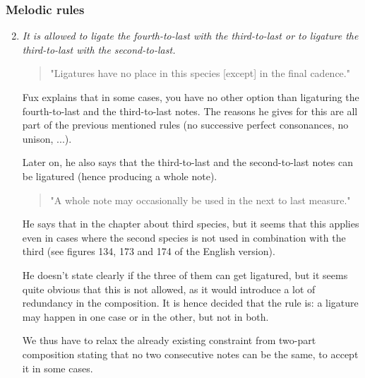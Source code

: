 \subsubsection{Melodic rules}
\begin{enumerate}[wide, label=\bfseries 2.M\arabic*]
\setcounter{enumi}{1} %
    \item \greendots \textit{It is allowed to ligate the fourth-to-last with the third-to-last or to ligature the third-to-last with the second-to-last.} \label{rule:2nd-species-ligatures}    
    \begin{quotation}
        "Ligatures have no place in this species [except] in the final cadence."
        \textcite[p.87]{GaPEng}
    \end{quotation}
    Fux explains that in some cases, you have no other option than ligaturing the fourth-to-last and the third-to-last notes. The reasons he gives for this are all part of the previous mentioned rules (no successive perfect consonances, no unison, ...).

    Later on, he also says that the third-to-last and the second-to-last notes can be ligatured (hence producing a whole note).
    \begin{quotation}
        "A whole note may occasionally be used in the next to last measure."
        \textcite[p.93]{GaPEng}
    \end{quotation}
    He says that in the chapter about third species, but it seems that this applies even in cases where the second species is not used in combination with the third (see figures 134, 173 and 174 of the English version).

    He doesn't state clearly if the three of them can get ligatured, but it seems quite obvious that this is not allowed, as it would introduce a lot of redundancy in the composition. It is hence decided that the rule is: a ligature may happen in one case or in the other, but not in both.

    We thus have to relax the already existing constraint from two-part composition stating that no two consecutive notes can be the same, to accept it in some cases.
\end{enumerate}

